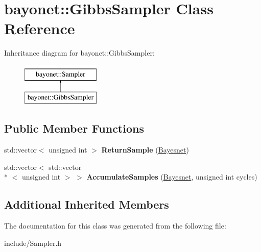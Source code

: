 \hypertarget{classbayonet_1_1_gibbs_sampler}{\section{bayonet\-:\-:Gibbs\-Sampler Class Reference}
\label{classbayonet_1_1_gibbs_sampler}
}
Inheritance diagram for bayonet\-:\-:Gibbs\-Sampler\-:\begin{figure}[H]
\begin{center}
\leavevmode
\includegraphics[height=2.000000cm]{classbayonet_1_1_gibbs_sampler}
\end{center}
\end{figure}
\subsection*{Public Member Functions}
\begin{DoxyCompactItemize}
\item 
\hypertarget{classbayonet_1_1_gibbs_sampler_a8b35908dc647c1e058c4155d24c26bf7}{std\-::vector$<$ unsigned int $>$ {\bfseries Return\-Sample} (\hyperlink{classbayonet_1_1_bayesnet}{Bayesnet})}\label{classbayonet_1_1_gibbs_sampler_a8b35908dc647c1e058c4155d24c26bf7}

\item 
\hypertarget{classbayonet_1_1_gibbs_sampler_a702c92aa472e6a134fd728123a78f24b}{std\-::vector$<$ std\-::vector\\*
$<$ unsigned int $>$ $>$ {\bfseries Accumulate\-Samples} (\hyperlink{classbayonet_1_1_bayesnet}{Bayesnet}, unsigned int cycles)}\label{classbayonet_1_1_gibbs_sampler_a702c92aa472e6a134fd728123a78f24b}

\end{DoxyCompactItemize}
\subsection*{Additional Inherited Members}


The documentation for this class was generated from the following file\-:\begin{DoxyCompactItemize}
\item 
include/Sampler.\-h\end{DoxyCompactItemize}
